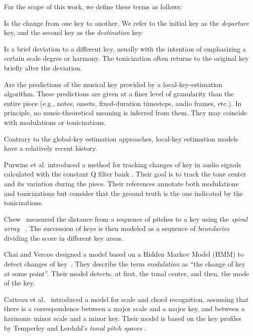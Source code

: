 For the scope of this work, we define these terms as
follows:

Is the change from one key to another. We refer to the
initial key as the \emph{departure} key, and the second key
as the \emph{destination} key.

Is a brief deviation to a different key, usually with the
intention of emphasizing a certain scale degree or harmony.
The tonicization often returns to the original key briefly
after the deviation.

Are the predictions of the musical key provided by a
local-key-estimation algorithm. These predictions are given
at a finer level of granularity than the entire piece (e.g.,
notes, onsets, fixed-duration timesteps, audio frames,
etc.). In principle, no music-theoretical meaning is
inferred from them. They may coincide with modulations or
tonicizations.

\label{ssec:localkey}

Contrary to the global-key estimation approaches, local-key
estimation models have a relatively recent history.

Purwins et al. introduced a method for tracking changes of
key in audio signals %
calculated with the constant Q filter bank
\cite{purwins2000new}. Their goal is to track the tone
center and its variation during the piece. Their references
annotate both modulations and tonicizations but consider
that the ground truth is the one indicated by the
tonicizations.

Chew~\cite{chew2002key} measured the distance from a
sequence of pitches to a key using the \emph{spiral array}
~\cite{chew2000towardsam}. The succession of keys is then
modeled as a sequence of \emph{boundaries} dividing the
score in different key areas.

Chai and Vercoe designed a model based on a Hidden Markov
Model (HMM) to detect changes of
key~\cite{chai2005detection}. They describe the term
\emph{modulation} as ``the change of key at some point''.
Their model detects, at first, the tonal center, and then,
the mode of the key.

Catteau et al.~\cite{catteau07tonalkey} introduced a model
for scale and chord recognition, assuming that there is a
correspondence between a major scale and a major key, and
between a harmonic minor scale and a minor key. Their model
is based on the key profiles by Temperley
\cite{temperley99tonality} and Lerdahl's \emph{tonal pitch
spaces} \cite{lerdahl88tps}.

